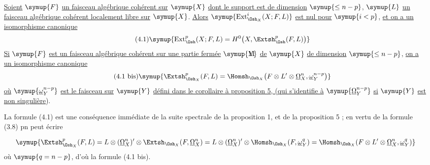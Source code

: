  \uline{Soient} $\symup{F}$ \uline{un faisceau algébrique cohérent sur} $\symup{X}$ \uline{dont le
support est de dimension} $\symup{\leq n-p}$, $\symup{L}$ \uline{un faisceau algébrique cohérent
localement libre sur} $\symup{X}$. \uline{Alors} $\symup{\operatorname{Ext}_{\Osh_X}^{i}(X;F,L)}$ \uline{est nul
pour} $\symup{i<p}$, \uline{et on a un isomorphisme canonique}
\begin{equation}\tag{4.1}
  \symup{\operatorname{Ext}_{\Osh}^{p}(X;F,L)
  =H^{0}\bigl(X,\Extsh_{\Osh}^{p}(F,L)\bigr)}
\end{equation}
\uline{Si} $\symup{F}$ \uline{est un faisceau algébrique cohérent sur une partie fermée} $\symup{\text{\rlap{M}Y}}$ \uline{de} $\symup{X}$ \uline{de
dimension} $\symup{\leq n-p}$, \uline{on a un isomorphisme canonique}
\begin{equation}\tag{4.1 bis}
  \symup{\Extsh_{\Osh_X}^{p}(F,L)
  =\Homsh_{\Osh_X}\!\left(
    F\otimes L'\otimes\underline{\Omega}_X^{n},\underline{\omega}_Y^{n-p}
  \right)}
\end{equation}
\uline{où} $\symup{\underline{\omega}_Y^{n-p}}$ \uline{est le faisceau sur} $\symup{Y}$ \uline{défini dans le corollaire à
proposition 5, (qui s'identifie à} $\symup{\underline{\Omega}_Y^{n-p}}$ \uline{si} $\symup{Y}$ \uline{est non singulière}).

La formule (4.1) est une conséquence immédiate de la suite spectrale de la
proposition 1, et de la proposition 5 ; en vertu de la formule (3.8) pn peut
écrire

\[
\symup{\Extsh_{\Osh_X}^{p}(F,L)
=L\otimes(\underline{\Omega}_X^{n})'\otimes
  \Extsh_{\Osh_X}(F,\underline{\Omega}_X^{n})
=L\otimes(\underline{\Omega}_X^{n})'\otimes
  \Homsh_{\Osh_X}(F,\underline{\omega}_Y^{q})
=\Homsh_{\Osh_X}\!\left(
  F\otimes L'\otimes\underline{\Omega}_X^{n},\underline{\omega}_Y^{q}\right)}
\]
où $\symup{q=n-p}$, d'où la formule (4.1 bis).

